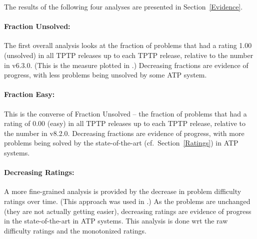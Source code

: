 \documentclass[runningheads]{llncs}
\begin{document}
\vspace*{1em}
\noindent
The results of the following four analyses are presented in Section~\ref{Evidence}.

\paragraph{Fraction Unsolved:}
The first overall analysis looks at the fraction of problems that had a rating 1.00 
(unsolved) in all TPTP releases up to each TPTP release, relative to the number in v6.3.0.
(This is the measure plotted in \cite{SSP21}.)
Decreasing fractions are evidence of progress, with less problems being unsolved by some ATP 
system.

\paragraph{Fraction Easy:}
This is the converse of Fraction Unsolved -- the fraction of problems that had a rating of 
0.00 (easy) in all TPTP releases up to each TPTP release, relative to the number in v8.2.0.
Decreasing fractions are evidence of progress, with more problems being solved by the 
state-of-the-art (cf.~Section~\ref{Ratings}) in ATP systems.

\paragraph{Decreasing Ratings:}
A more fine-grained analysis is provided by the decrease in problem difficulty ratings over
time. 
(This approach was used in \cite{SFS01}.)
As the problems are unchanged (they are not actually getting easier), decreasing ratings are 
evidence of progress in the state-of-the-art in ATP systems.
This analysis is done wrt the raw difficulty ratings and the monotonized ratings.
\end{document}
